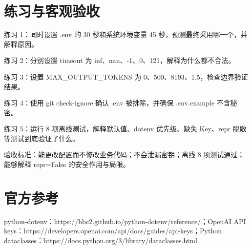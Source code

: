 \documentclass[UTF8,11pt,a4paper]{ctexart}
\begin{document}
\section{练习与客观验收}
练习 1：同时设置 .env 的 30 秒和系统环境变量 45 秒，预测最终采用哪一个，并解释原因。
\par
练习 2：分别设置 timeout 为 inf、nan、-1、0、121，解释为什么都不合法。
\par
练习 3：设置 MAX\_OUTPUT\_TOKENS 为 0、500、8193、1.5，检查边界验证结果。
\par
练习 4：使用 git check-ignore 确认 .env 被排除，并确保 .env.example 不含秘密。
\par
练习 5：运行 8 项离线测试，解释默认值、dotenv 优先级、缺失 Key、repr 脱敏等测试到底验证了什么。
\par
验收标准：能更改配置而不修改业务代码；不会泄漏密钥；离线 8 项测试通过；能够解释 repr=False 的安全作用与局限。
\par
\section{官方参考}
python-dotenv：https://bbc2.github.io/python-dotenv/reference/；OpenAI API keys：https://developers.openai.com/api/docs/guides/api-keys；Python dataclasses：https://docs.python.org/3/library/dataclasses.html
\par
\end{document}
